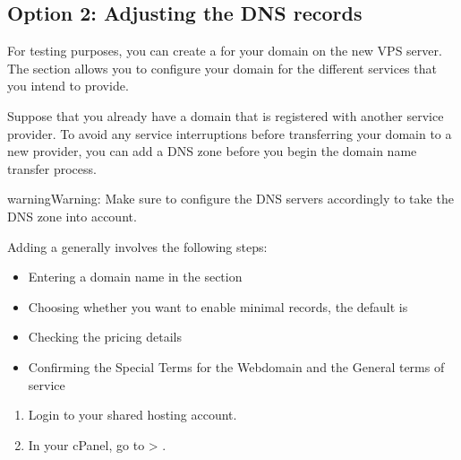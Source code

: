 \documentclass[a4paper,10pt,english,openany,oneside]{sphinxmanual}
\begin{document}
\begin{sloppypar}
\subsection{Option 2: Adjusting the DNS records}
\label{\detokenize{joomla-to-vps:option-2-adjusting-the-dns-records}}
\sphinxAtStartPar
For testing purposes, you can create a  for your domain on the new VPS server. The  section allows you to configure your domain for the different services that you intend to provide.

\sphinxAtStartPar
Suppose that you already have a domain that is registered with another service provider. To avoid any service interruptions before transferring your domain to a new provider, you can add a DNS zone before you begin the domain name transfer process.

\begin{sphinxadmonition}{warning}{Warning:}
\sphinxAtStartPar
Make sure to configure the DNS servers accordingly to take the DNS zone into account.
\end{sphinxadmonition}

\sphinxAtStartPar
Adding a  generally involves the following steps:
\begin{itemize}
\item {} 
\sphinxAtStartPar
Entering a domain name in the  section

\item {} 
\sphinxAtStartPar
Choosing whether you want to enable minimal records, the default is 

\item {} 
\sphinxAtStartPar
Checking the pricing details

\item {} 
\sphinxAtStartPar
Confirming the Special Terms for the Webdomain and the General terms of service

\end{itemize}
\begin{enumerate}
%
\item {} 
\sphinxAtStartPar
Login to your shared hosting account.

\item {} 
\sphinxAtStartPar
In your cPanel, go to  > .
\begin{quote}


\end{quote}
\end{enumerate}
\end{sloppypar}
\end{document}
